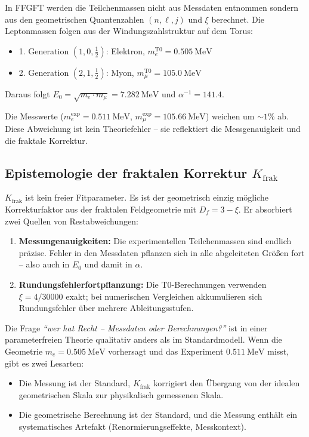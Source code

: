 \documentclass[12pt, a4paper]{article}
\newcommand{\xipar}{\xi}
\newcommand{\Kfrak}{K_{\text{frak}}}
\newcommand{\Dfrak}{D_f}
\begin{document}
In FFGFT werden die Teilchenmassen nicht aus Messdaten entnommen sondern aus den geometrischen Quantenzahlen $(n, \ell, j)$ und $\xipar$ berechnet. Die Leptonmassen folgen aus der Windungszahlstruktur auf dem Torus:
\begin{itemize}[noitemsep]
  \item 1. Generation $(1,0,\tfrac{1}{2})$: Elektron, $m_e^{\text{T0}} = 0.505\ \text{MeV}$
  \item 2. Generation $(2,1,\tfrac{1}{2})$: Myon, $m_\mu^{\text{T0}} = 105.0\ \text{MeV}$
\end{itemize}

Daraus folgt $E_0 = \sqrt{m_e \cdot m_\mu} = 7.282\ \text{MeV}$ und $\alpha^{-1} = 141.4$.

Die Messwerte ($m_e^{\text{exp}} = 0.511\ \text{MeV}$, $m_\mu^{\text{exp}} = 105.66\ \text{MeV}$) weichen um $\sim 1\%$ ab. Diese Abweichung ist kein Theoriefehler -- sie reflektiert die Messgenauigkeit und die fraktale Korrektur.

\subsection{Epistemologie der fraktalen Korrektur $\Kfrak$}

$\Kfrak$ ist kein freier Fitparameter. Es ist der geometrisch einzig mögliche Korrekturfaktor aus der fraktalen Feldgeometrie mit $\Dfrak = 3 - \xipar$. Er absorbiert zwei Quellen von Restabweichungen:

\begin{enumerate}[noitemsep]
  \item \textbf{Messungenauigkeiten:} Die experimentellen Teilchenmassen sind endlich präzise. Fehler in den Messdaten pflanzen sich in alle abgeleiteten Größen fort -- also auch in $E_0$ und damit in $\alpha$.
  \item \textbf{Rundungsfehlerfortpflanzung:} Die T0-Berechnungen verwenden $\xipar = 4/30000$ exakt; bei numerischen Vergleichen akkumulieren sich Rundungsfehler über mehrere Ableitungsstufen.
\end{enumerate}

Die Frage \textit{``wer hat Recht -- Messdaten oder Berechnungen?''} ist in einer parameterfreien Theorie qualitativ anders als im Standardmodell. Wenn die Geometrie $m_e = 0.505\ \text{MeV}$ vorhersagt und das Experiment $0.511\ \text{MeV}$ misst, gibt es zwei Lesarten:

\begin{itemize}[noitemsep]
  \item Die Messung ist der Standard, $\Kfrak$ korrigiert den Übergang von der idealen geometrischen Skala zur physikalisch gemessenen Skala.
  \item Die geometrische Berechnung ist der Standard, und die Messung enthält ein systematisches Artefakt (Renormierungseffekte, Messkontext).
\end{itemize}
\end{document}
